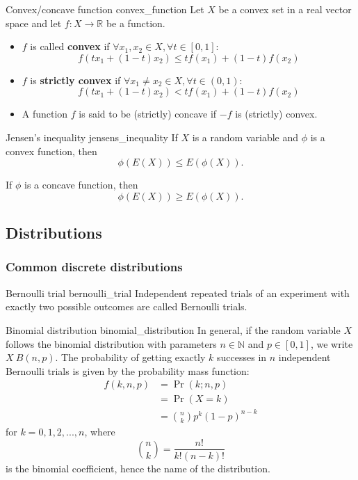 \begin{definition}{Convex/concave function \cite{math2901_notes}}{convex_function}
	Let $X$ be a convex set in a real vector space and let $f : X \to \mathbb{R}$ be a function.
	\begin{itemize}
		\item $f$ is called \textbf{convex} if $\forall x_1, x_2 \in X, \forall t \in [0, 1]$:
		$$ f(t x_1 + (1 - t) x_2) \leq t f(x_1) + (1 - t) f(x_2) $$

		\item $f$ is \textbf{strictly convex} if $\forall x_1 \neq x_2 \in X, \forall t \in (0, 1)$:
		$$ f(t x_1 + (1 - t) x_2) < t f(x_1) + (1 - t) f(x_2) $$

		\item A function $f$ is said to be (strictly) concave if $-f$ is (strictly) convex.
	\end{itemize}	
\end{definition}

\begin{lemma}{Jensen's inequality \cite{wikipedia_jensens_inequality}}{jensens_inequality}
	If $X$ is a random variable and $\phi$ is a convex function, then
	$$ \phi(E(X)) \leq E(\phi(X)) . $$

	If $\phi$ is a concave function, then
	$$ \phi(E(X)) \geq E(\phi(X)) . $$
\end{lemma}

\subsection{Distributions}

\subsubsection{Common discrete distributions}

\begin{definition}{Bernoulli trial \cite{wikipedia_bernoulli_trial}}{bernoulli_trial}
	Independent repeated trials of an experiment with exactly two possible outcomes are called Bernoulli trials.
\end{definition}

\begin{definition}{Binomial distribution \cite{wikipedia_binomial_distribution}}{binomial_distribution}
	In general, if the random variable $X$ follows the binomial distribution with parameters $n \in \mathbb{N}$ and $p \in [0, 1]$, we write $X ~ B(n, p)$. The probability of getting exactly $k$ successes in $n$ independent Bernoulli trials is given by the probability mass function:
	\begin{align*}
		f(k,n,p) &= \Pr(k; n, p) \\
		&= \Pr(X = k) \\
		&= {\binom{n}{k}} p^{k} (1 - p)^{n - k}
	\end{align*}
	for $k = 0, 1, 2, ..., n$, where
	$$ {\binom{n}{k}} = \frac {n!}{k!(n-k)!} $$
	is the binomial coefficient, hence the name of the distribution. 
\end{definition}

